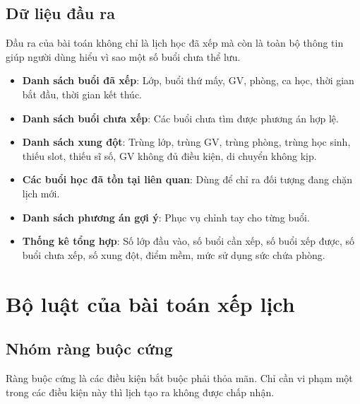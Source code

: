 \documentclass[../DoAn.tex]{subfiles}
\begin{document}
\subsection{Dữ liệu đầu ra}
Đầu ra của bài toán không chỉ là lịch học đã xếp mà còn là toàn bộ thông tin giúp người dùng hiểu vì sao một số buổi chưa thể lưu.
\begin{itemize}
    \item \textbf{Danh sách buổi đã xếp}: Lớp, buổi thứ mấy, GV, phòng, ca học, thời gian bắt đầu, thời gian kết thúc.
    \item \textbf{Danh sách buổi chưa xếp}: Các buổi chưa tìm được phương án hợp lệ.
    \item \textbf{Danh sách xung đột}: Trùng lớp, trùng GV, trùng phòng, trùng học sinh, thiếu slot, thiếu sĩ số, GV không đủ điều kiện, di chuyển không kịp.
    \item \textbf{Các buổi học đã tồn tại liên quan}: Dùng để chỉ ra đối tượng đang chặn lịch mới.
    \item \textbf{Danh sách phương án gợi ý}: Phục vụ chỉnh tay cho từng buổi.
    \item \textbf{Thống kê tổng hợp}: Số lớp đầu vào, số buổi cần xếp, số buổi xếp được, số buổi chưa xếp, số xung đột, điểm mềm, mức sử dụng sức chứa phòng.
\end{itemize}

\section{Bộ luật của bài toán xếp lịch}
\label{section:5.3}

\subsection{Nhóm ràng buộc cứng}
Ràng buộc cứng là các điều kiện bắt buộc phải thỏa mãn. Chỉ cần vi phạm một trong các điều kiện này thì lịch tạo ra không được chấp nhận.
\end{document}
